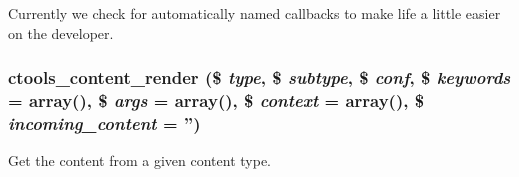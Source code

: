 Currently we check for automatically named callbacks to make life a little easier on the developer. \hypertarget{content_8inc_ae0ad07a6b466f81e14a32b70c716f3a1}{
\subsubsection[{ctools\_\-content\_\-render}]{\setlength{\rightskip}{0pt plus 5cm}ctools\_\-content\_\-render (\$ {\em type}, \/  \$ {\em subtype}, \/  \$ {\em conf}, \/  \$ {\em keywords} = {\ttfamily array()}, \/  \$ {\em args} = {\ttfamily array()}, \/  \$ {\em context} = {\ttfamily array()}, \/  \$ {\em incoming\_\-content} = {\ttfamily ''})}}
\label{content_8inc_ae0ad07a6b466f81e14a32b70c716f3a1}
Get the content from a given content type.


